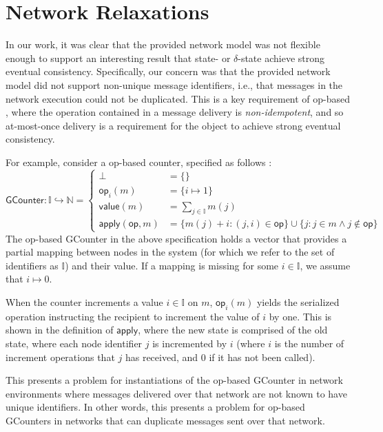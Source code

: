 \section{Network Relaxations}
\label{sec:network-relaxations}
In our work, it was clear that the provided network model was not flexible
enough to support an interesting result that state- or $\delta$-state
\CRDTs achieve strong eventual consistency. Specifically, our concern was that
the provided network model did not support non-unique message identifiers, i.e.,
that messages in the network execution could not be duplicated. This is a key
requirement of op-based \CRDTs, where the operation contained in a message
delivery is \textit{non-idempotent}, and so at-most-once delivery is a
requirement for the object to achieve strong eventual consistency.

For example, consider a op-based counter, specified as follows :
\[
\mathsf{GCounter}
  : \mathbb{I} \hookrightarrow \mathbb{N}
  = \left\{
      \begin{aligned}
        \bot &= \{\} \\
        \mathsf{op}_i(m) &= \{ i \mapsto 1 \} \\
        \mathsf{value}(m) &= \sum_{j \in \mathbb{I}} m(j) \\
        \mathsf{apply}(\mathsf{op}, m) &= \{
          m(j) + i : (j, i) \in \mathsf{op}
        \} \cup \{ j : j \in m \land j \notin \mathsf{op} \}
      \end{aligned}
    \right.
\]
The op-based GCounter in the above specification holds a vector that provides a
partial mapping between nodes in the system (for which we refer to the set of
identifiers as $\mathbb{I}$) and their value. If a mapping is missing for some
$i \in \mathbb{I}$, we assume that $i \mapsto 0$.

When the counter increments a value $i \in \mathbb{I}$ on $m$,
$\mathsf{op}_i(m)$ yields the serialized operation instructing the recipient
\CRDT to increment the value of $i$ by one. This is shown in the definition of
$\mathsf{apply}$, where the new state is comprised of the old state, where each
node identifier $j$ is incremented by $i$ (where $i$ is the number of increment
operations that $j$ has received, and $0$ if it has not been called).

This presents a problem for instantiations of the op-based GCounter in network
environments where messages delivered over that network are not known to have
unique identifiers. In other words, this presents a problem for op-based
GCounters in networks that can duplicate messages sent over that network.

